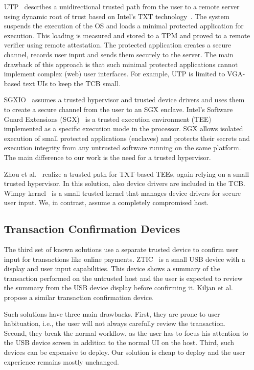 UTP~\cite{utp} describes a unidirectional trusted path from the user to a remote server using dynamic root of trust based on Intel's TXT technology~\cite{mccune2008flicker}. The system suspends the execution of the OS and loads a minimal protected application for execution. This loading is measured and stored to a TPM and proved to a remote verifier using remote attestation. The protected application creates a secure channel, records user input and sends them securely to the server. The main drawback of this approach is that such minimal protected applications cannot implement complex (web) user interfaces. For example, UTP is limited to VGA-based text UIs to keep the TCB small.

SGXIO~\cite{sgxio} assumes a trusted hypervisor and trusted device drivers and uses them to create a secure channel from the user to an SGX enclave. Intel's Software Guard Extensions (SGX)~\cite{sgx} is a trusted execution environment (TEE) implemented as a specific execution mode in the processor. SGX allows isolated execution of small protected applications (enclaves) and protects their secrets and execution integrity from any untrusted software running on the same platform. The main difference to our work is the need for a trusted hypervisor.

Zhou et al.~\cite{x86} realize a trusted path for TXT-based TEEs, again relying on a small trusted hypervisor. In this solution, also device drivers are included in the TCB. Wimpy kernel~\cite{wimpyKernel} is a small trusted kernel that manages device drivers for secure user input. We, in contrast, assume a completely compromised host.


\subsection{Transaction Confirmation Devices} 

The third set of known solutions use a separate trusted device to confirm user input for transactions like online payments. ZTIC~\cite{weigold2011} is a small USB device with a display and user input capabilities. This device shows a summary of the transaction performed on the untrusted host and the user is expected to review the summary from the USB device display before confirming it. Kiljan et al.~\cite{6978928} propose a similar transaction confirmation device. 

Such solutions have three main drawbacks. First, they are prone to user habituation, i.e., the user will not always carefully review the transaction. Second, they break the normal workflow, as the user has to focus his attention to the USB device screen in addition to the normal UI on the host. Third, such devices can be expensive to deploy. Our solution is cheap to deploy and the user experience remains mostly unchanged. 

